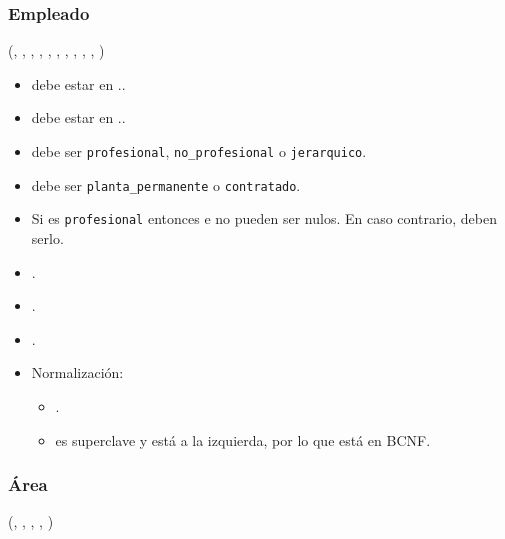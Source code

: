 \subsubsection{Empleado}

    (, , , ,
        , , , ,
        , , )

    \begin{itemize}
        \item {} debe estar en ..
        \item {} debe estar en ..
        \item {} debe ser \verb|profesional|, \verb|no_profesional|
            o \verb|jerarquico|.
        \item {} debe ser \verb|planta_permanente| o 
            \verb|contratado|.
        \item Si  es \verb|profesional| entonces 
             e  no pueden ser nulos.
            En caso contrario, deben serlo.
        \item {}.
        \item {}.
        \item {}.

        \item Normalización:
            
            \begin{itemize}

                \item {}.
                    
                \item {} es superclave y está a la izquierda, por lo
                    que está en BCNF.
            \end{itemize}
    \end{itemize}


\subsubsection{Área}
    (, , , , 
        )

